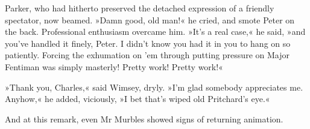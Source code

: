 Parker, who had hitherto preserved the detached expression of a friendly spectator, now beamed. »Damn good, old man!« he cried, and smote Peter on the back. Professional enthusiasm overcame him. »It's a real case,« he said, »and you've handled it finely, Peter. I didn't know you had it in you to hang on so patiently. Forcing the exhumation on 'em through putting pressure on Major Fentiman was simply masterly! Pretty work! Pretty work!«

»Thank you, Charles,« said Wimsey, dryly. »I'm glad somebody appreciates me. Anyhow,« he added, viciously, »I bet that's wiped old Pritchard's eye.«

And at this remark, even Mr Murbles showed signs of returning animation.